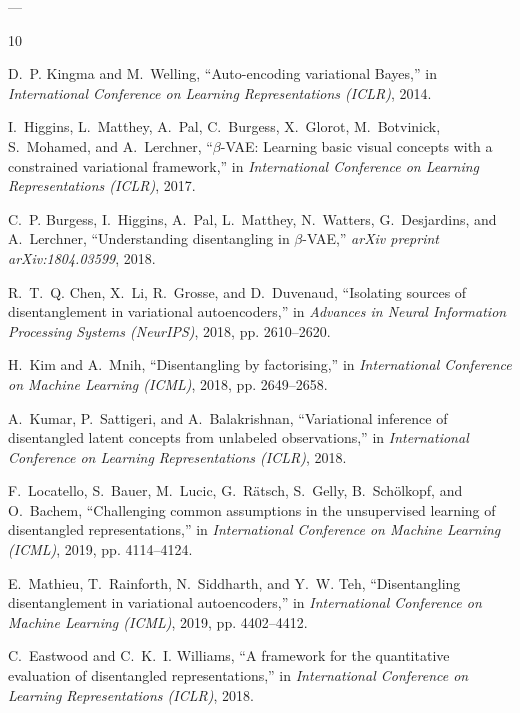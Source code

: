 \documentclass[10pt,journal,compsoc]{IEEEtran}
\begin{document}
---


\begin{thebibliography}{10}

D.~P. Kingma and M.~Welling, ``Auto-encoding variational {B}ayes,'' in \emph{International Conference on Learning Representations (ICLR)}, 2014.

I.~Higgins, L.~Matthey, A.~Pal, C.~Burgess, X.~Glorot, M.~Botvinick, S.~Mohamed, and A.~Lerchner, ``$\beta$-{VAE}: Learning basic visual concepts with a constrained variational framework,'' in \emph{International Conference on Learning Representations (ICLR)}, 2017.

C.~P. Burgess, I.~Higgins, A.~Pal, L.~Matthey, N.~Watters, G.~Desjardins, and A.~Lerchner, ``Understanding disentangling in $\beta$-{VAE},'' \emph{arXiv preprint arXiv:1804.03599}, 2018.

R.~T.~Q. Chen, X.~Li, R.~Grosse, and D.~Duvenaud, ``Isolating sources of disentanglement in variational autoencoders,'' in \emph{Advances in Neural Information Processing Systems (NeurIPS)}, 2018, pp. 2610--2620.

H.~Kim and A.~Mnih, ``Disentangling by factorising,'' in \emph{International Conference on Machine Learning (ICML)}, 2018, pp. 2649--2658.

A.~Kumar, P.~Sattigeri, and A.~Balakrishnan, ``Variational inference of disentangled latent concepts from unlabeled observations,'' in \emph{International Conference on Learning Representations (ICLR)}, 2018.

F.~Locatello, S.~Bauer, M.~Lucic, G.~R{\"a}tsch, S.~Gelly, B.~Sch{\"o}lkopf, and O.~Bachem, ``Challenging common assumptions in the unsupervised learning of disentangled representations,'' in \emph{International Conference on Machine Learning (ICML)}, 2019, pp. 4114--4124.

E.~Mathieu, T.~Rainforth, N.~Siddharth, and Y.~W. Teh, ``Disentangling disentanglement in variational autoencoders,'' in \emph{International Conference on Machine Learning (ICML)}, 2019, pp. 4402--4412.

C.~Eastwood and C.~K.~I. Williams, ``A framework for the quantitative evaluation of disentangled representations,'' in \emph{International Conference on Learning Representations (ICLR)}, 2018.


\end{thebibliography}
\end{document}
